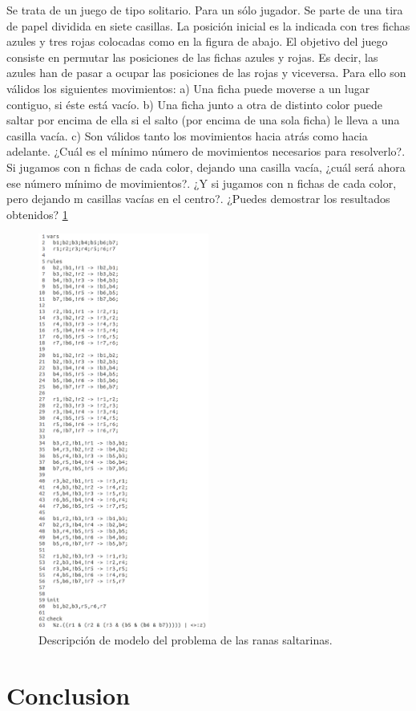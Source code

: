 Se trata de un juego de tipo solitario. Para un sólo jugador.
Se parte de una tira de papel dividida en siete casillas.
La posición inicial es la indicada con tres fichas azules y tres rojas colocadas como en la figura de abajo.
El objetivo del juego consiste en permutar las posiciones de las fichas azules y rojas. Es decir, las azules han de pasar a ocupar las posiciones de las rojas y viceversa. Para ello son válidos los siguientes movimientos:
a) Una ficha puede moverse a un lugar contiguo, si éste está vacío.
b) Una ficha junto a otra de distinto color puede saltar por encima de ella si el salto (por encima de una sola ficha) le lleva a una casilla vacía.
c) Son válidos tanto los movimientos hacia atrás como hacia adelante.
¿Cuál es el mínimo número de movimientos necesarios para resolverlo?.
Si jugamos con n fichas de cada color, dejando una casilla vacía, ¿cuál será ahora ese número mínimo de movimientos?.
¿Y si jugamos con n fichas de cada color, pero dejando m casillas vacías en el centro?.
¿Puedes demostrar los resultados obtenidos? \cite{Juegos:11} \ref{fig:ranas}

\begin{figure}[H]
  \centering
  \includegraphics[width=0.5\textwidth]{Figures/ranas.png}
  \caption{Descripción de modelo del problema de las ranas saltarinas.}
  \label{fig:ranas}
\end{figure}

\chapter*{Conclusion}